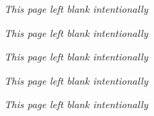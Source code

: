 \documentclass[10pt,twoside,openany]{book}
\begin{document}
\centerline{{\small\textsl{This page left blank intentionally}}}
\thispagestyle{empty}

\clearpage
\centerline{{\small\textsl{This page left blank intentionally}}}
\thispagestyle{empty}

\setcounter{chapter}{04}

\clearpage
\centerline{{\small\textsl{This page left blank intentionally}}}
\thispagestyle{empty}
 
\newpage
\makeatletter
\def\@makechapterhead#1{%
  \vspace*{50\p@}%
  {\parindent \z@ \raggedleft \normalfont
    \ifnum \c@secnumdepth >\m@ne
      \if@mainmatter
        \huge{\it \bfseries  Anubandha}\space \thechapter
        \par\nobreak
        \vskip 20\p@
      \fi
    \fi
    \interlinepenalty\@M
    \iflanguage{sanskrit}{\devanagarifont\LARGE\bfseries #1}{\englishfont\LARGE\bfseries #1}\par\nobreak
    \vskip 20\p@
  }}
\makeatother
\setcounter{chapter}{0}

\clearpage

\centerline{{\small\textsl{This page left blank intentionally}}}
\thispagestyle{empty}

\newpage
{}

\clearpage

\centerline{{\small\textsl{This page left blank intentionally}}}
\thispagestyle{empty}

\newpage
\makeatletter
\def\@makechapterhead#1{%
  \vspace*{50\p@}%
  {\parindent \z@ \raggedleft \normalfont
    \ifnum \c@secnumdepth >\m@ne
      \if@mainmatter
        \par\nobreak
        \vskip 20\p@
      \fi
    \fi
    \interlinepenalty\@M
    \iflanguage{sanskrit}{\devanagarifont\LARGE\bfseries #1}{\englishfont\LARGE\bfseries #1}\par\nobreak
    \vskip 20\p@
  }}
\makeatother
{}

\clearpage

%
\end{document}
